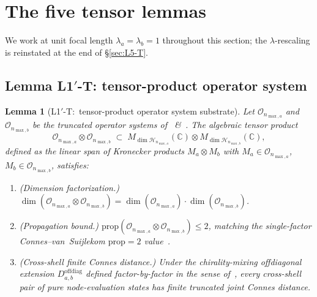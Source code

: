 \documentclass[11pt,a4paper]{article}
\theoremstyle{plain}
\newtheorem{lemma}[theorem]{Lemma}
\theoremstyle{definition}
\newcommand{\nmaxa}{n_{\max,a}}
\newcommand{\nmaxb}{n_{\max,b}}
\newcommand{\Hilb}{\mathcal{H}}
\newcommand{\Op}{\mathcal{O}}
\newcommand{\C}{\mathbb{C}}
\newcommand{\Mat}{M}
\begin{document}
\section{The five tensor lemmas}\label{sec:lemmas}

We work at unit focal length $\lambda_a = \lambda_b = 1$ throughout
this section; the $\lambda$-rescaling is reinstated at the end of
\S\ref{sec:L5-T}.

\subsection{Lemma L1$'$-T: tensor-product operator system}
\label{sec:L1prime-T}

\begin{lemma}[L1$'$-T:\ tensor-product operator system substrate]
\label{lem:L1prime-T}
Let $\Op_{\nmaxa}$ and $\Op_{\nmaxb}$ be the truncated operator systems
of \cite[\S 3.1]{loutey_paper38}~\&~\cite[Lemma~3.1]{loutey_paper38}.
The algebraic tensor product
\begin{equation*}
  \Op_{\nmaxa} \otimes \Op_{\nmaxb}
  \;\subset\; M_{\dim \Hilb_{\nmaxa}}(\C) \otimes M_{\dim \Hilb_{\nmaxb}}(\C),
\end{equation*}
defined as the linear span of Kronecker products $\Mat_a \otimes \Mat_b$
with $\Mat_a \in \Op_{\nmaxa}$, $\Mat_b \in \Op_{\nmaxb}$, satisfies:
\begin{enumerate}\setlength{\itemsep}{2pt}
\item[(a)] (Dimension factorization.)
$\dim(\Op_{\nmaxa} \otimes \Op_{\nmaxb})
= \dim(\Op_{\nmaxa}) \cdot \dim(\Op_{\nmaxb})$.
\item[(b)] (Propagation bound.) $\mathrm{prop}(\Op_{\nmaxa} \otimes
\Op_{\nmaxb}) \le 2$, matching the single-factor Connes--van~Suijlekom
$\mathrm{prop} = 2$ value~\cite[\S 4.2]{connes_vs2021}.
\item[(c)] (Cross-shell finite Connes distance.) Under the
chirality-mixing offdiagonal extension $D_{a,b}^{\mathrm{offdiag}}$
defined factor-by-factor in the sense
of~\cite[Lemma~3.1]{loutey_paper38}, every cross-shell pair of pure
node-evaluation states has finite truncated joint Connes distance.
\end{enumerate}
\end{lemma}
\end{document}
